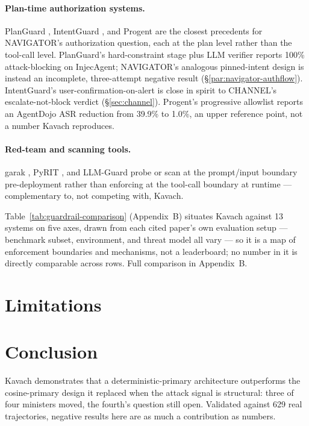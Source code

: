 \documentclass[sigconf,anonymous,review]{acmart}
\begin{document}
\paragraph{Plan-time authorization systems.} PlanGuard
\cite{gong2026planguard}, IntentGuard \cite{kang2025intentguard}, and
Progent \cite{shi2025progent} are the closest precedents for NAVIGATOR's
authorization question, each at the plan level rather than the tool-call
level. PlanGuard's hard-constraint stage plus LLM verifier reports 100\%
attack-blocking on InjecAgent; NAVIGATOR's analogous pinned-intent design
is instead an incomplete, three-attempt negative result
(\S\ref{par:navigator-authflow}). IntentGuard's user-confirmation-on-alert
is close in spirit to CHANNEL's escalate-not-block verdict
(\S\ref{sec:channel}). Progent's progressive allowlist reports an
AgentDojo ASR reduction from 39.9\% to 1.0\%, an upper reference point,
not a number Kavach reproduces.

\paragraph{Red-team and scanning tools.} garak \cite{garak2024}, PyRIT
\cite{pyrit2024}, and LLM-Guard \cite{llmguard2024} probe or scan at the
prompt/input boundary pre-deployment rather than enforcing at the
tool-call boundary at runtime --- complementary to, not competing with,
Kavach.

Table~\ref{tab:guardrail-comparison} (Appendix~B) situates Kavach against
13 systems on five axes, drawn from each cited paper's own evaluation
setup --- benchmark subset, environment, and threat model all vary --- so
it is a map of enforcement boundaries and mechanisms, not a leaderboard;
no number in it is directly comparable across rows. Full comparison
in Appendix~B.

\section{Limitations}
\label{sec:limitations}


\section{Conclusion}
\label{sec:conclusion}
Kavach demonstrates that a deterministic-primary architecture outperforms
the cosine-primary design it replaced when the attack signal is
structural: three of four ministers moved, the fourth's question still
open. Validated against 629 real trajectories, negative results here are
as much a contribution as numbers.
\end{document}
